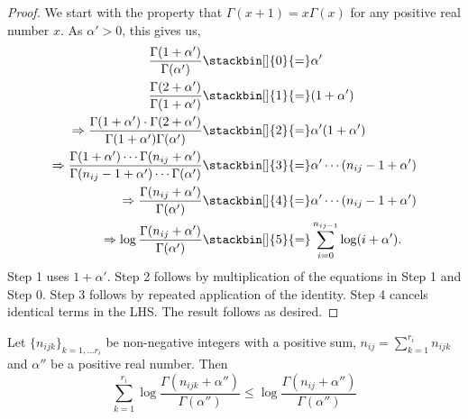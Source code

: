 \documentclass[letterpaper]{article}
\newenvironment{customlem}[1]
  {\renewcommand\theinnercustomlem{#1}\innercustomlem}
  {\endinnercustomlem}
\begin{document}
\begin{proof}
We start with the property that $\Gamma(x+1) = x\Gamma(x)$ for any positive real number $x$. As $\alpha' > 0$, this gives us,
\begin{align*}
    \frac{\Gamma(1 + \alpha')}{\Gamma(\alpha') } &\stackbin[]{0}{=} \alpha' \\
     \frac{\Gamma(2 + \alpha')}{ \Gamma(1+ \alpha')} &\stackbin[]{1}{=} (1+ \alpha') \\
    \Rightarrow    \frac{\Gamma(1 + \alpha')\cdot\Gamma(2 + \alpha')}{ \Gamma(1+ \alpha')\Gamma(\alpha') }  &\stackbin[]{2}{=} \alpha' (1+ \alpha')\\
    \Rightarrow  \frac{\Gamma(1 + \alpha')\cdots\Gamma(n_{ij
    }+ \alpha')}{ \Gamma(n_{ij} -1 + \alpha')\cdots\Gamma(\alpha')} &\stackbin[]{3}{=} \alpha'\cdots (n_{ij} -1 + \alpha') \\
    \Rightarrow  \frac{\Gamma(n_{ij} + \alpha') }{ \Gamma(\alpha')} &\stackbin[]{4}{=} \alpha'\cdots (n_{ij} -1 + \alpha')\\
    \Rightarrow \log \frac{\Gamma(n_{ij}+ \alpha')}{\Gamma(\alpha')} &\stackbin[]{5}{=} \sum_{i=0}^{n_{ij -1}}\log (i + \alpha').
\end{align*}
Step 1 uses $1 + \alpha'$. Step 2 follows by multiplication of the equations in Step 1 and Step 0. Step 3 follows by repeated application of the identity. Step 4 cancels identical terms in the LHS. The result follows as desired.
\end{proof}

\begin{customlem}{6B}
Let $\{n_{ijk}\}_{k=1,...r_{i}}$ be non-negative integers with a positive sum, $n_{ij} = \sum_{k=1}^{r_i} n_{ijk}$ and $\alpha''$ be a positive real number. Then
\begin{equation*}
    \sum_{k=1}^{r_i} \log \frac{\Gamma(n_{ijk} + \alpha'')}{\Gamma(\alpha'')} \leq \log \frac{\Gamma(n_{ij} + \alpha'')}{\Gamma(\alpha'')}
\end{equation*} \label{lem:gamma2}
\end{customlem}
\end{document}
